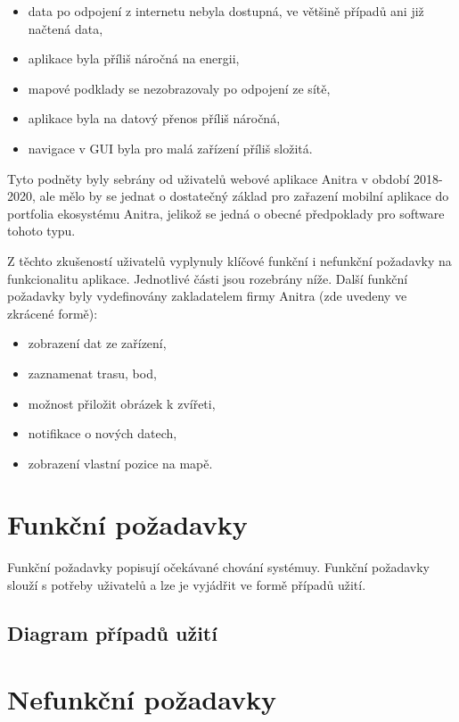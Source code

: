 \begin{itemize}
	\item data po odpojení z internetu nebyla dostupná, ve většině případů ani již načtená data,
	\item aplikace byla příliš náročná na energii,
	\item mapové podklady se nezobrazovaly po odpojení ze sítě,
	\item aplikace byla na datový přenos příliš náročná,
	\item navigace v GUI byla pro malá zařízení příliš složitá.
\end{itemize}

Tyto podněty byly sebrány od uživatelů webové aplikace Anitra v období 2018-2020, ale mělo by se jednat o dostatečný základ pro zařazení mobilní aplikace do portfolia ekosystému Anitra, jelikož se jedná o obecné předpoklady pro software tohoto typu.

Z těchto zkušeností uživatelů vyplynuly klíčové funkční i nefunkční požadavky na funkcionalitu aplikace. Jednotlivé části jsou rozebrány níže. Další funkční požadavky byly vydefinovány zakladatelem firmy Anitra (zde uvedeny ve zkrácené formě):

\begin{itemize}
	\item zobrazení dat ze zařízení,
	\item zaznamenat trasu, bod,
	\item možnost přiložit obrázek k zvířeti,
	\item notifikace o nových datech,
	\item zobrazení vlastní pozice na mapě.
\end{itemize}

\section{Funkční požadavky}

Funkční požadavky popisují očekávané chování systémuy. Funkční požadavky slouží s potřeby uživatelů a lze je vyjádřit ve formě případů užití. 

\subsection{Diagram případů užití}

\section{Nefunkční požadavky}

